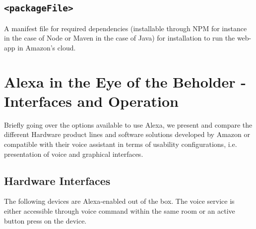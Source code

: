 \subsection*{\texttt{<packageFile>}}
A manifest file for required dependencies (installable through NPM for instance in the case of Node or Maven in the case of Java) for installation to run the web-app in Amazon's cloud.




\section[Alexa in the Eye of the Beholder]{Alexa in the Eye of the Beholder - \\Interfaces and Operation}

Briefly going over the options available to use Alexa, we present and compare the different Hardware product lines and software solutions developed by Amazon or compatible with their voice assistant in terms of usability configurations, i.e. presentation of voice and graphical interfaces.

\subsection*{Hardware Interfaces}

The following devices are Alexa-enabled out of the box. The voice service is either accessible through voice command within the same room or an active button press on the device.

